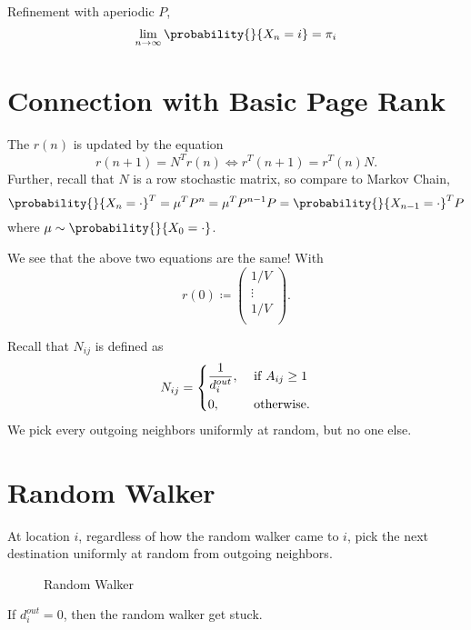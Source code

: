 Refinement with aperiodic \(P\),
\[
	\lim_{n\to \infty }\probability{}{X_n = i} = \pi_i
\]

\section{Connection with Basic Page Rank}
\begin{prev}
	The \(r(n)\) is updated by the equation
	\[
		r(n+1) = N^{T}r(n) \iff r^{T}(n+1) = r^{T}(n)N.
	\]
	Further, recall that \(N\) is a row stochastic matrix, so compare to Markov Chain,
	\[
		\probability{}{X_n = \cdot}^{T} = \mu^{T}P^n = \mu^{T}P^{n-1}P = \probability{}{X_{n-1} = \cdot}^{T}P
	\]
	where \(\mu\sim \probability{}{X_0 = \cdot}\).

	We see that the above two equations are the same! With
	\[
		r(0)\coloneqq \begin{pmatrix}
			1/V    \\
			\vdots \\
			1/V    \\
		\end{pmatrix}.
	\]
\end{prev}

Recall that \(N_{ij}\) is defined as
\[
	N_{ij} = \begin{dcases}
		\frac{1}{d_i^{out}}, & \text{ if }A_{ij}\geq 1 \\
		0,                   & \text{ otherwise}.
	\end{dcases}
\]
We pick every outgoing neighbors uniformly at random, but no one else.

\section{Random Walker}
\begin{intuition}
	At location \(i\), regardless of how the random walker came to \(i\), pick the next destination uniformly at random from outgoing neighbors.
\end{intuition}

\begin{figure}[H]
	\centering
	\caption{Random Walker}
	\label{fig:random-walker}
\end{figure}

\begin{note}
	If \(d_i^{out} = 0\), then the random walker get stuck.
\end{note}